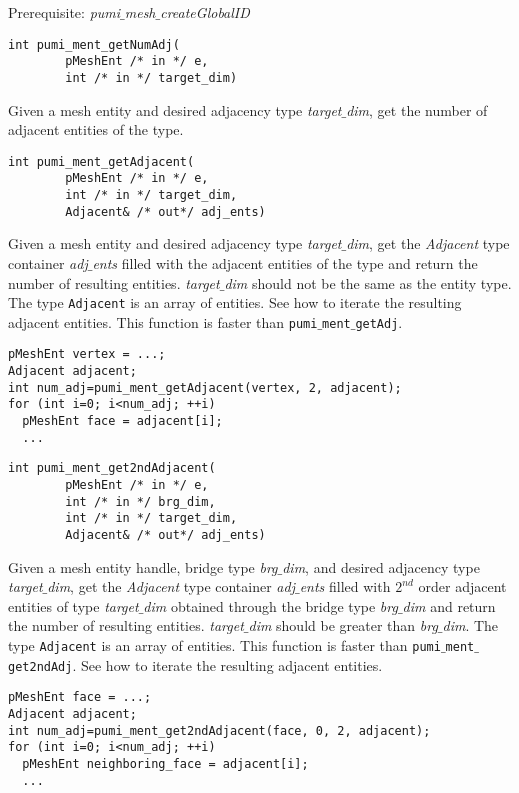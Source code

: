 Prerequisite: \emph{pumi$\_$mesh$\_$createGlobalID}

\begin{verbatim}
int pumi_ment_getNumAdj(
        pMeshEnt /* in */ e,
        int /* in */ target_dim)
\end{verbatim}\vspace{-.5cm}\hspace{1cm}
        Given a mesh entity and desired adjacency type \emph{target$\_$dim}, get the number of adjacent entities of the type. 

\begin{verbatim}
int pumi_ment_getAdjacent(
        pMeshEnt /* in */ e,
        int /* in */ target_dim,
        Adjacent& /* out*/ adj_ents)
\end{verbatim}\vspace{-.5cm}\hspace{1cm}
        Given a mesh entity and desired adjacency type \emph{target$\_$dim}, get the \emph{Adjacent} type container \emph{adj$\_$ents} filled with the adjacent entities of the type and return the number of resulting entities. \emph{target$\_$dim} should not be the same as the entity type. The type \texttt{Adjacent} is an array of entities. See how to iterate the resulting adjacent entities. This function is faster than \texttt{pumi$\_$ment$\_$getAdj}.
\begin{verbatim}
pMeshEnt vertex = ...;
Adjacent adjacent;
int num_adj=pumi_ment_getAdjacent(vertex, 2, adjacent);
for (int i=0; i<num_adj; ++i)
  pMeshEnt face = adjacent[i];
  ...
\end{verbatim}\vspace{-.5cm}\hspace{1cm}

\begin{verbatim}
int pumi_ment_get2ndAdjacent(
        pMeshEnt /* in */ e,
        int /* in */ brg_dim,
        int /* in */ target_dim,
        Adjacent& /* out*/ adj_ents)
\end{verbatim}\vspace{-.5cm}\hspace{1cm}
        Given a mesh entity handle, bridge type \emph{brg$\_$dim}, and desired adjacency type \emph{target$\_$dim}, get the \emph{Adjacent} type container \emph{adj$\_$ents} filled with $2^{nd}$ order adjacent entities of type \emph{target$\_$dim} obtained through the bridge type \emph{brg$\_$dim} and return the number of resulting entities. \emph{target$\_$dim} should be greater than \emph{brg$\_$dim}. The type \texttt{Adjacent} is an array of entities. This function is faster than \texttt{pumi$\_$ment$\_$get2ndAdj}. See how to iterate the resulting adjacent entities.
\begin{verbatim} 
pMeshEnt face = ...;
Adjacent adjacent;
int num_adj=pumi_ment_get2ndAdjacent(face, 0, 2, adjacent);
for (int i=0; i<num_adj; ++i)
  pMeshEnt neighboring_face = adjacent[i];
  ...
\end{verbatim}\vspace{-.5cm}\hspace{1cm}

